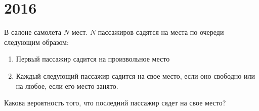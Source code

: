 \documentclass[11pt, a4paper]{template}
\begin{document}
\chapter{2016}

\begin{exercise}
В салоне самолета $N$ мест. $N$ пассажиров садятся на места по очереди следующим образом:
\begin{enumerate}
\item Первый пассажир садится на произвольное место
\item Каждый следующий пассажир садится на свое место, если оно свободно или на любое, если его место занято.
\end{enumerate}
Какова вероятность того, что последний пассажир сядет на свое место?
\end{exercise}
\end{document}
